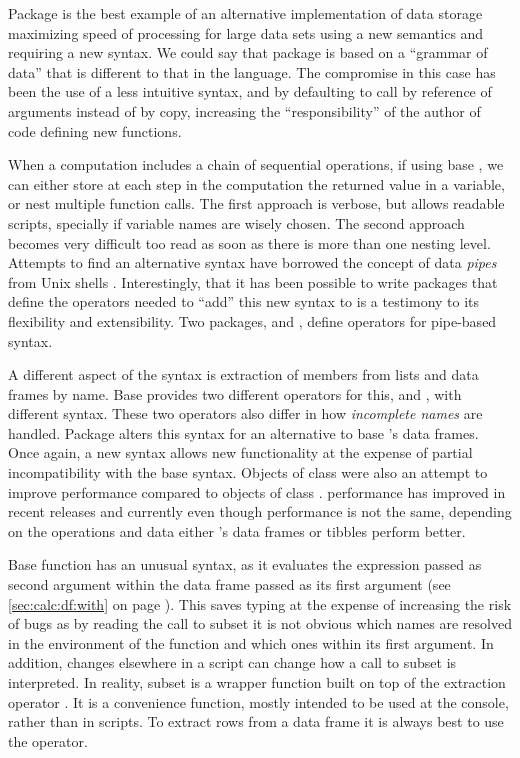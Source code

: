 \documentclass[krantz2]{krantz}\usepackage{knitr}%
\begin{document}
Package  is the best example of an alternative implementation of data storage maximizing speed of processing for large data sets using a new semantics and requiring a new syntax. We could say that package  is based on a ``grammar of data'' that is different to that in the \Rlang language. The compromise in this case has been the use of a less intuitive syntax, and by defaulting to call by reference of arguments instead of by copy, increasing the ``responsibility'' of the author of code defining new functions.

When a computation includes a chain of sequential operations, if using base \Rlang, we can either store at each step in the computation the returned value in a variable, or nest multiple function calls. The first approach is verbose, but allows readable scripts, specially if variable names are wisely chosen. The second approach becomes very difficult too read as soon as there is more than one nesting level. Attempts to find an alternative syntax have borrowed the concept of data \emph{pipes} from Unix shells \autocite{Kernigham1981}. Interestingly, that it has been possible to write packages that define the operators needed to ``add'' this new syntax to \Rlang is a testimony to its flexibility and extensibility. Two packages,  and , define operators for pipe-based syntax.

A different aspect of the \Rlang syntax is extraction of members from lists and data frames by name. Base \Rlang provides two different operators for this, \code{\$} and \code{[]}, with different syntax. These two operators also differ in how \emph{incomplete names} are handled. Package  alters this syntax for an alternative to base \Rlang's data frames. Once again, a new syntax allows new functionality at the expense of partial incompatibility with the base \Rlang syntax. Objects of class  were also an attempt to improve performance compared to objects of class . \Rlang performance has improved in recent releases and currently even though performance is not the same, depending on the operations and data either \Rlang's data frames or tibbles perform better.

Base \Rlang function  has an unusual syntax, as it evaluates the expression passed as second argument within the data frame passed as its first argument (see \ref{sec:calc:df:with} on page \pageref{sec:calc:df:with}). This saves typing at the expense of increasing the risk of bugs as by reading the call to subset it is not obvious which names are resolved in the environment of the function and which ones within its first argument. In addition, changes elsewhere in a script can change how a call to subset is interpreted. In reality, subset is a wrapper function built on top of the extraction operator \code{[]}. It is a convenience function, mostly intended to be used at the console, rather than in scripts. To extract rows from a data frame it is always best to use the \code{[ , ]} operator.
\end{document}
